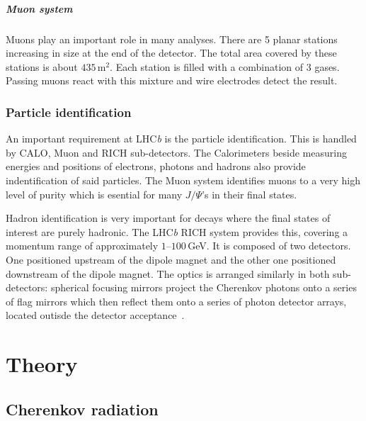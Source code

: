 \documentclass[11pt,twoside]{scrreprt}
\begin{document}
\paragraph{Muon system}
Muons play an important role in many analyses. There are 5 planar stations increasing in size at the end of the detector. The total area covered by these stations is about $435$\,m$^2$. Each station is filled with a combination of 3 gases. Passing muons react with this mixture and wire electrodes detect the result.


\subsection{Particle identification} %
\label{sub:particle_identification}
An important requirement at LHC\textit{b} is the particle identification. This is handled by CALO, Muon and RICH sub-detectors. The Calorimeters beside measuring energies and positions of electrons, photons and hadrons also provide indentification of said particles. The Muon system identifies muons to a very high level of purity which is esential for many \(J/\Psi\)'s in their final states.

Hadron identification is very important for decays where the final states of interest are purely hadronic. The LHC\textit{b} RICH system provides this, covering a momentum range of approximately $1$--$100$\,GeV. It is composed of two detectors. One positioned upstream of the dipole magnet and the other one positioned downstream of the dipole magnet. The optics is arranged similarly in both sub-detectors: spherical focusing mirrors project the Cherenkov photons onto a series of flag mirrors which then reflect them onto a series of photon detector arrays, located outisde the detector acceptance~\cite{Powell:2011}.



\chapter{Theory}

\section{Cherenkov radiation} %
\label{sec:cherenkov_radiation}
\end{document}
